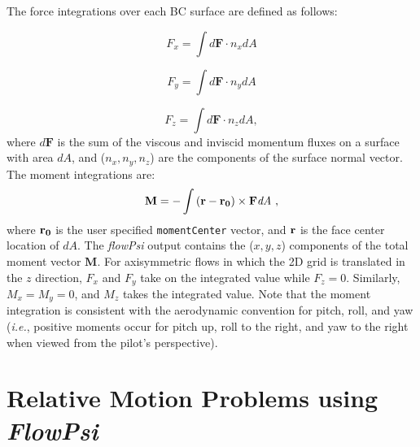 \documentclass{article}
\begin{document}
The force integrations over each BC surface are defined as follows:

\begin{equation}
F_x = \int{d\textbf{F} \cdot n_x dA}
\end{equation}

\begin{equation}
F_y = \int{d\textbf{F} \cdot n_y dA}
\end{equation}

\begin{equation}
F_z = \int{d\textbf{F} \cdot n_z dA},
\end{equation}
where $d\textbf{F}$ is the sum of the viscous and inviscid momentum fluxes on a surface with area $dA$, and ($n_x,n_y,n_z$) are the components of the surface normal vector.  The moment integrations are:
\begin{equation}
\textbf{M} = - \int{ \bf{(r - r_0)} \times \textbf{F} \textit{dA}} ~ ,
\end{equation}
where $\bf{r_0}$ is the user specified \verb!momentCenter! vector, and
$\bf{r}$ is the face center location of $dA$.  The {\em flowPsi}
output contains the ($x,y,z$) components of the total moment vector
$\textbf{M}$.  For axisymmetric flows in which the 2D grid is
translated in the $z$ direction, $F_x$ and $F_y$ take on the
integrated value while $F_z = 0$.  Similarly, $M_x = M_y = 0$, and
$M_z$ takes the integrated value.  Note that the moment integration is
consistent with the aerodynamic convention for pitch, roll, and yaw
({\it{i.e.}}, positive moments occur for pitch up, roll to the right,
and yaw to the right when viewed from the pilot's perspective).




\section{Relative Motion Problems using {\em FlowPsi}}
\end{document}
